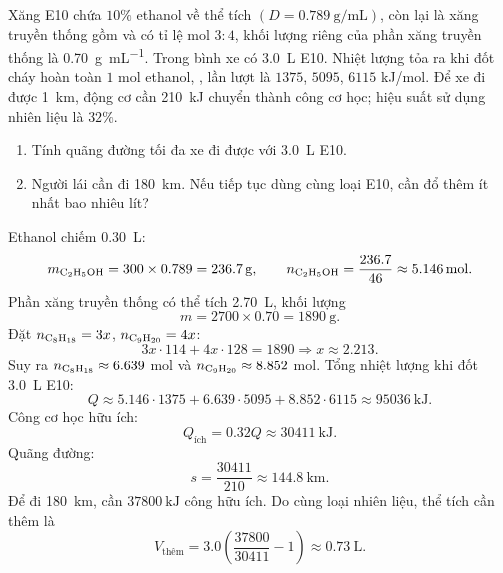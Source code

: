 \begin{tuluyen}
Xăng E10 chứa \(10\%\) ethanol về thể tích \((D=\SI{0.789}{\gram\per\milli\liter})\), còn lại là xăng truyền thống gồm  và  có tỉ lệ mol \(3:4\), khối lượng riêng của phần xăng truyền thống là \SI{0.70}{\gram\per\milli\liter}. Trong bình xe có \SI{3.0}{\liter} E10. Nhiệt lượng tỏa ra khi đốt cháy hoàn toàn \(1\) mol ethanol, ,  lần lượt là \(1375\), \(5095\), \(6115\) kJ/mol. Để xe đi được \SI{1}{\kilo\metre}, động cơ cần \SI{210}{\kilo\joule} chuyển thành công cơ học; hiệu suất sử dụng nhiên liệu là \(32\%\).
\begin{enumerate}
\item Tính quãng đường tối đa xe đi được với \SI{3.0}{\liter} E10.
\item Người lái cần đi \SI{180}{\kilo\metre}. Nếu tiếp tục dùng cùng loại E10, cần đổ thêm ít nhất bao nhiêu lít?
\end{enumerate}
\begin{loigiaiBT}
Ethanol chiếm \SI{0.30}{\liter}:
\[
m_{\ce{C2H5OH}}=300\times0.789=\SI{236.7}{\gram},
\qquad
n_{\ce{C2H5OH}}=\frac{236.7}{46}\approx\SI{5.146}{\mole}.
\]
Phần xăng truyền thống có thể tích \SI{2.70}{\liter}, khối lượng
\[
m=2700\times0.70=\SI{1890}{\gram}.
\]
Đặt \(n_{\ce{C8H18}}=3x\), \(n_{\ce{C9H20}}=4x\):
\[
3x\cdot114+4x\cdot128=1890\Rightarrow x\approx2.213.
\]
Suy ra \(n_{\ce{C8H18}}\approx6.639\) mol và \(n_{\ce{C9H20}}\approx8.852\) mol.
Tổng nhiệt lượng khi đốt \SI{3.0}{\liter} E10:
\[
Q\approx5.146\cdot1375+6.639\cdot5095+8.852\cdot6115
\approx\SI{95036}{\kilo\joule}.
\]
Công cơ học hữu ích:
\[
Q_{\mathrm{ích}}=0.32Q\approx\SI{30411}{\kilo\joule}.
\]
Quãng đường:
\[
s=\frac{30411}{210}\approx\SI{144.8}{\kilo\metre}.
\]
Để đi \SI{180}{\kilo\metre}, cần \(\SI{37800}{\kilo\joule}\) công hữu ích. Do cùng loại nhiên liệu, thể tích cần thêm là
\[
V_{\mathrm{thêm}}
=3.0\left(\frac{37800}{30411}-1\right)
\approx\SI{0.73}{\liter}.
\]
\end{loigiaiBT}
\end{tuluyen}

